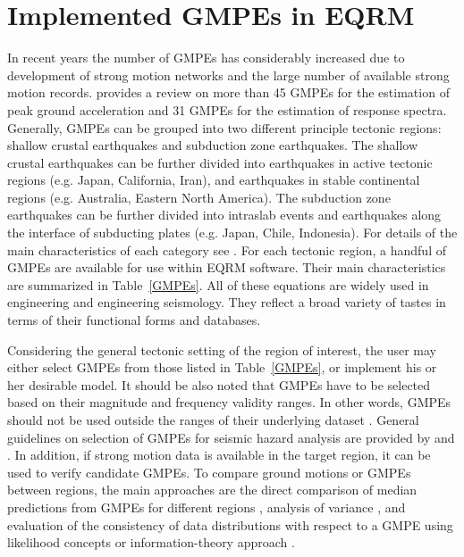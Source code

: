 \section{Implemented GMPEs in EQRM}\label{sec:implemented} In
recent years the number of GMPEs has considerably increased due to
development of strong motion networks and the large number of
available strong motion records. \citet{eqrm_Douglas06} provides a
review on more than 45 GMPEs for the estimation of peak ground
acceleration and 31 GMPEs for the estimation of response spectra.
Generally, GMPEs can be grouped into two different principle
tectonic regions: shallow crustal earthquakes and subduction zone
earthquakes. The shallow crustal earthquakes can be further divided
into earthquakes in active tectonic regions (e.g. Japan, California,
Iran), and earthquakes in stable continental regions (e.g.
Australia, Eastern North America). The subduction zone earthquakes
can be further divided into intraslab events and earthquakes along
the interface of subducting plates (e.g. Japan, Chile, Indonesia).
For details of the main characteristics of each category see
\citet{eqrm_Campbell03}. For each tectonic region, a handful of
GMPEs are available for use within EQRM software. Their main
characteristics are summarized in Table~\ref{GMPEs}. All of these
equations are widely used in engineering and engineering seismology.
They reflect a broad variety of tastes in terms of their functional
forms and databases.

Considering the general tectonic setting of the region of interest,
the user may either select GMPEs from those listed in
Table~\ref{GMPEs}, or implement his or her desirable model. It
should be also noted that GMPEs have to be selected based on their
magnitude and frequency validity ranges. In other words, GMPEs
should not be used outside the ranges of their underlying dataset
\citep{eqrm_Bommer07}. General guidelines on selection of GMPEs for
seismic hazard analysis are provided by \citet{eqrm_Cotton06} and
\citet{eqrm_Bommer10}. In addition, if strong motion data is
available in the target region, it can be used to verify candidate
GMPEs. To compare ground motions or GMPEs between regions, the main
approaches are the direct comparison of median predictions from
GMPEs for different regions \citep{eqrm_Stafford08}, analysis of
variance \citep{eqrm_Douglas04}, and evaluation of the consistency
of data distributions with respect to a GMPE using likelihood
concepts \citep{eqrm_Scherbaum04} or information-theory approach
\citep{eqrm_Scherbaum09}.

